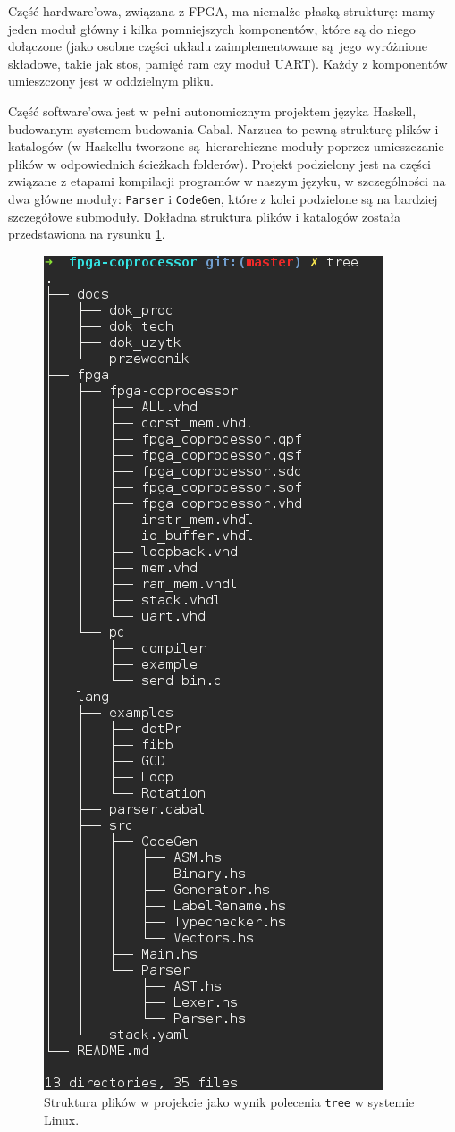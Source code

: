 Część hardware'owa, związana z FPGA, ma niemalże płaską strukturę: mamy jeden moduł główny i kilka pomniejszych komponentów, które są do niego dołączone (jako osobne części układu zaimplementowane są jego wyróżnione składowe, takie jak stos, pamięć ram czy moduł UART). Każdy z komponentów umieszczony jest w oddzielnym pliku.

Część software'owa jest w pełni autonomicznym projektem języka Haskell, budowanym systemem budowania Cabal. Narzuca to pewną strukturę plików i katalogów (w Haskellu tworzone są hierarchiczne moduły poprzez umieszczanie plików w odpowiednich ścieżkach folderów). Projekt podzielony jest na części związane z etapami kompilacji programów w naszym języku, w szczególności na dwa główne moduły: \texttt{Parser} i \texttt{CodeGen}, które z kolei podzielone są na bardziej szczegółowe submoduły. Dokładna struktura plików i katalogów została przedstawiona na rysunku \ref{fig:file-structure}.

\begin{figure}
  \begin{center}
    \includegraphics[scale=0.5]{images/file_structure.png}
    \caption{Struktura plików w projekcie jako wynik polecenia \texttt{tree} w systemie Linux.}
    \label{fig:file-structure}
  \end{center}
\end{figure}
